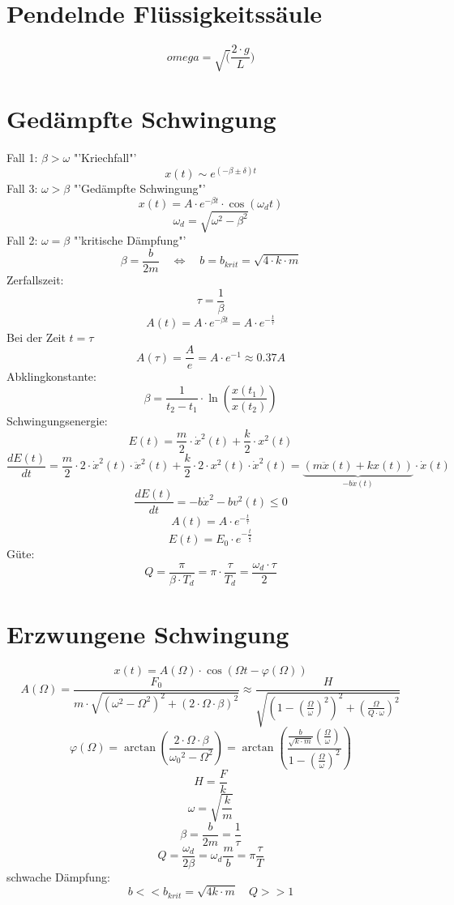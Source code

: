 \section{Pendelnde Flüssigkeitssäule}
\[ \boxed{omega = \sqrt(\frac{2 \cdot g}{L})} \]

\section{Gedämpfte Schwingung}
Fall 1: $\beta > \omega$ "'Kriechfall"'
\[ \boxed{x(t) \sim e^{(-\beta \pm \delta)t}} \]
Fall 3: $\omega > \beta$ "'Gedämpfte Schwingung"'
\[ \boxed{x(t) = A \cdot e^{-\beta t} \cdot \cos(\omega_d t)} \]
\[ \boxed{\omega_d = \sqrt{\omega^2 - \beta^2}} \]
Fall 2: $\omega = \beta$ "'kritische Dämpfung"'
\[ \boxed{\beta = \frac{b}{2 m} \quad \Leftrightarrow \quad 
b = b_{krit} = \sqrt{4 \cdot k \cdot m}} \]
Zerfallszeit: 
\[ \boxed{\tau = \frac{1}{\beta}} \]
\[ \boxed{A(t) = A \cdot e^{-\beta t} = A \cdot e^{-\frac{t}{\tau}}} \]
Bei der Zeit $t = \tau$
\[ \boxed{A(\tau) = \frac{A}{e} = A \cdot e^{-1} \approx 0.37 A} \]
Abklingkonstante: 
\[ \boxed{\beta 
= \frac{1}{t_2 - t_1} \cdot \ln\left(\frac{x(t_1)}{x(t_2)}\right)} \]
Schwingungsenergie: 
\[ \boxed{E(t) = \frac{m}{2} \cdot \dot{x}^2(t) + \frac{k}{2} \cdot x^2(t)} \]
\[ \boxed{\frac{d E(t)}{dt} 
= \frac{m}{2} \cdot 2 \cdot \dot{x}^2(t) \cdot \ddot{x}^2(t) 
+ \frac{k}{2} \cdot 2 \cdot x^2(t) \cdot \dot{x}^2(t) 
= \underbrace{(m \ddot{x}(t) + k x(t))}_{-b \dot{x}(t)} \cdot \dot{x}(t)} \]
\[ \boxed{\frac{d E(t)}{dt} = -b \dot{x}^2 - b v^2(t) \leq 0} \]
\[ \boxed{A(t) = A \cdot e^{-\frac{t}{\tau}}} \]
\[ \boxed{E(t) = E_0 \cdot e^{-\frac{t}{\frac{\tau}{2}}}} \]
Güte: 
\[ \boxed{Q = \frac{\pi}{\beta \cdot T_d} = \pi \cdot \frac{\tau}{T_d} 
= \frac{\omega_d \cdot \tau}{2}} \]

\section{Erzwungene Schwingung}
\[ \boxed{x(t) = A(\Omega) \cdot \cos(\Omega t - \varphi(\Omega))} \]
\[ \boxed{A(\Omega) = \frac{F_0}{m \cdot 
\sqrt{(\omega^2 - \Omega^2)^2 + (2 \cdot \Omega \cdot \beta)^2}} 
\approx \frac{H}{\sqrt{\left(1 - \left(\frac{\Omega}{\omega}\right)^2\right)^2 
+ \left(\frac{\Omega}{Q \cdot \omega}\right)^2}}} \]  
\[ \boxed{\varphi(\Omega) = \arctan\left(\frac{2 \cdot \Omega \cdot \beta}
{{\omega_0}^2 - \Omega^2}\right) 
= \arctan{\left(\frac{\frac{b}{\sqrt{k \cdot m}} 
\left(\frac{\Omega}{\omega}\right)}
{1 - \left(\frac{\Omega}{\omega}\right)^2}\right)}} \]
\[ \boxed{H = \frac{F}{k}} \]
\[ \boxed{\omega = \sqrt{\frac{k}{m}}} \]
\[ \boxed{\beta = \frac{b}{2 m} = \frac{1}{\tau}} \]
\[ \boxed{Q = \frac{\omega_d}{2\beta} = \omega_d \frac{m}{b} 
= \pi \frac{\tau}{T}} \]
schwache Dämpfung: 
\[ \boxed{b << b_{krit} = \sqrt{4 k \cdot m} \quad Q >> 1} \]

